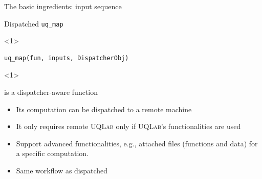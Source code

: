\documentclass[]{rsuqbeamernew}
\begin{document}
\begin{frame}[fragile]{The basic ingredients: input sequence}

\end{frame}

\begin{frame}[fragile]{Dispatched \texttt{uq\_map}}

\begin{onlyenv}<1>
\begin{lstlisting}[basicstyle=\large,numbers=none]
uq_map(fun, inputs, DispatcherObj)
\end{lstlisting}
\end{onlyenv}

\begin{onlyenv}<1>
\begin{block}{ is a dispatcher-aware function}
\begin{itemize}
  \item Its computation can be dispatched to a remote machine
  \item It only requires remote \textsc{UQLab} only if \textsc{UQLab}'s functionalities are used
  \item Support advanced functionalities,
        e.g., attached files (functions and data) for a specific computation.
  \item Same workflow as dispatched 
\end{itemize}
\end{block}
\end{onlyenv}


\end{frame}
\end{document}
